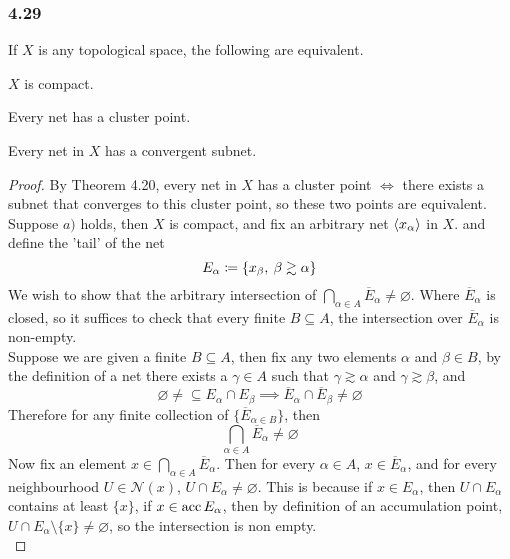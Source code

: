 \documentclass[../../main.tex]{subfiles}
\begin{document}
\subsubsection*{4.29}
\begin{wts}
If $X$ is any topological space, the following are equivalent.

\begin{enumalpha}
    \item $X$ is compact.
    \item Every net has a cluster point.
    \item Every net in $X$ has a convergent subnet.
\end{enumalpha}
\end{wts}
\newcommand{\xa}{\abrackets{x_\alpha}} %
\newcommand{\n}[1]{\mathcal{N}({#1})} %
\begin{proof}
By Theorem 4.20, every net in $X$ has a cluster point $\iff$ there exists a subnet that converges to this cluster point, so these two points are equivalent. \\

Suppose $a)$ holds, then $X$ is compact, and fix an arbitrary net $\xa$ in $X$. and define the 'tail' of the net 
\[
E_\alpha\coloneqq\{x_\beta,\:\beta\gtrsim\alpha\}
\]
We wish to show that the arbitrary intersection of $\bigcap_{\alpha\in A}\overline{E}_\alpha\neq\varnothing$. Where $\overline{E}_\alpha$ is closed, so it suffices to check that every finite $B\subseteq A$, the intersection over $\overline{E}_\alpha$ is non-empty.\\

Suppose we are given a finite $B\subseteq A$, then fix any two elements $\alpha$ and $\beta\in B$, by the definition of a net there exists a $\gamma\in A$ such that $\gamma\gtrsim\alpha$ and $\gamma\gtrsim\beta$, and
\[
\varnothing\neq\subseteq E_\alpha\cap E_\beta\implies \overline{E}_\alpha\cap\overline{E}_\beta\neq\varnothing
\]
Therefore for any finite collection of $\{\overline{E}_{\alpha\in B}\}$, then 
\[
\bigcap_{\alpha\in A}\overline{E}_\alpha\neq\varnothing
\]
Now fix an element $x\in \bigcap_{\alpha\in A}\overline{E}_\alpha$. Then for every $\alpha\in A$, $x\in \overline{E}_\alpha$, and for every neighbourhood $U\in\n{x}$, $U\cap E_\alpha\neq\varnothing$. This is because if $x\in E_\alpha$, then $U\cap E_\alpha$ contains at least $\{x\}$, if $x\in\operatorname{acc}{E_\alpha}$, then by definition of an accumulation point, $U\cap E_\alpha\setminus\{x\}\neq\varnothing$, so the intersection is non empty.\\


\end{proof}
\end{document}
